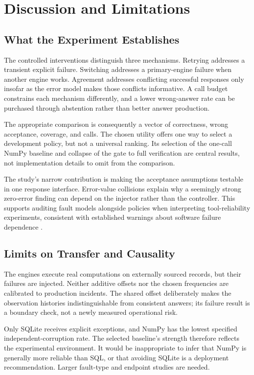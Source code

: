 \documentclass{svproc}
\begin{document}
\section{Discussion and Limitations}
\subsection{What the Experiment Establishes}
The controlled interventions distinguish three mechanisms. Retrying addresses a transient explicit failure. Switching addresses a primary-engine failure when another engine works. Agreement addresses conflicting successful responses only insofar as the error model makes those conflicts informative. A call budget constrains each mechanism differently, and a lower wrong-answer rate can be purchased through abstention rather than better answer production.

The appropriate comparison is consequently a vector of correctness, wrong acceptance, coverage, and calls. The chosen utility offers one way to select a development policy, but not a universal ranking. Its selection of the one-call NumPy baseline and collapse of the gate to full verification are central results, not implementation details to omit from the comparison.

The study's narrow contribution is making the acceptance assumptions testable in one response interface. Error-value collisions explain why a seemingly strong zero-error finding can depend on the injector rather than the controller. This supports auditing fault models alongside policies when interpreting tool-reliability experiments, consistent with established warnings about software failure dependence \cite{knight1986}.

\subsection{Limits on Transfer and Causality}
The engines execute real computations on externally sourced records, but their failures are injected. Neither additive offsets nor the chosen frequencies are calibrated to production incidents. The shared offset deliberately makes the observation histories indistinguishable from consistent answers; its failure result is a boundary check, not a newly measured operational risk.

Only SQLite receives explicit exceptions, and NumPy has the lowest specified independent-corruption rate. The selected baseline's strength therefore reflects the experimental environment. It would be inappropriate to infer that NumPy is generally more reliable than SQL, or that avoiding SQLite is a deployment recommendation. Larger fault-type and endpoint studies are needed.
\end{document}

